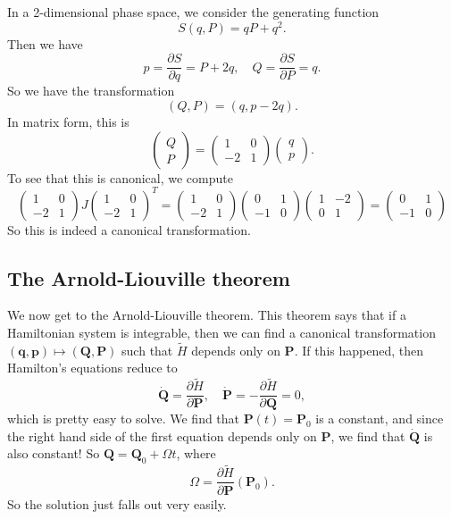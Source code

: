 \documentclass[a4paper]{article}
\begin{document}
\begin{eg}
  In a 2-dimensional phase space, we consider the generating function
  \[
    S(q, P) = qP + q^2.
  \]
  Then we have
  \[
    p = \frac{\partial S}{\partial q} = P + 2q,\quad Q = \frac{\partial S}{\partial P} = q.
  \]
  So we have the transformation
  \[
    (Q, P) = (q, p - 2q).
  \]
  In matrix form, this is
  \[
    \begin{pmatrix}
      Q\\P
    \end{pmatrix} =
    \begin{pmatrix}
      1 & 0\\
      -2 & 1
    \end{pmatrix}
    \begin{pmatrix}
      q\\p
    \end{pmatrix}.
  \]
  To see that this is canonical, we compute
  \[
    \begin{pmatrix}
      1 & 0\\
      -2 & 1
    \end{pmatrix}
    J
    \begin{pmatrix}
      1 & 0\\
      -2 & 1
    \end{pmatrix}^T =
    \begin{pmatrix}
      1 & 0\\
      -2 & 1
    \end{pmatrix}
    \begin{pmatrix}
      0 & 1\\
      -1 & 0
    \end{pmatrix}
    \begin{pmatrix}
      1 & -2\\
      0 & 1
    \end{pmatrix} =
    \begin{pmatrix}
      0 & 1\\
      -1 & 0
    \end{pmatrix}
  \]
  So this is indeed a canonical transformation.
\end{eg}

\subsection{The Arnold-Liouville theorem}
We now get to the Arnold-Liouville theorem. This theorem says that if a Hamiltonian system is integrable, then we can find a canonical transformation $(\mathbf{q}, \mathbf{p}) \mapsto (\mathbf{Q}, \mathbf{P})$ such that $\tilde{H}$ depends only on $\mathbf{P}$. If this happened, then Hamilton's equations reduce to
\[
  \dot{\mathbf{Q}} = \frac{\partial \tilde{H}}{\partial \mathbf{P}},\quad \dot{\mathbf{P}} = -\frac{\partial \tilde{H}}{\partial \mathbf{Q}} = 0,
\]
which is pretty easy to solve. We find that $\mathbf{P}(t) = \mathbf{P}_0$ is a constant, and since the right hand side of the first equation depends only on $\mathbf{P}$, we find that $\dot{\mathbf{Q}}$ is also constant! So $\mathbf{Q} = \mathbf{Q}_0 + \Omega t$, where
\[
  \Omega = \frac{\partial \tilde{H}}{\partial \mathbf{P}} (\mathbf{P}_0).
\]
So the solution just falls out very easily.
\end{document}
